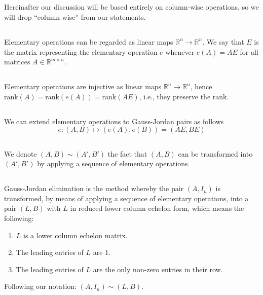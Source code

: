 \documentclass{proc-l}
\theoremstyle{definition}
\theoremstyle{remark}
\numberwithin{equation}{section}
\newcommand{\R}{\mathbb{R}}
\newcommand{\rank}[1]{\textrm{rank}({#1})}
\newcommand{\x}{\times}
\begin{document}
\subsection{}
Hereinafter our discussion will be based entirely on column-wise operations, so we will drop ``column-wise'' from our statements.

\subsection{}
Elementary operations can be regarded as linear maps $\R^n \to \R^n$. We say that $E$ is the matrix representing the elementary operation $e$ whenever $e(A) = AE$ for all matrices $A\in\R^{m\x n}$.

\subsection{}
Elementary operations are injective as linear maps $\R^n \to \R^n$, hence $\rank{A} = \rank{e(A)} = \rank{AE}$, i.e., they preserve the rank.

\subsection{}
We can extend elementary operations to Gauss-Jordan pairs as follows
\[
e: (A, B) \mapsto (e(A), e(B)) = (AE, BE)
\]

\subsection{}
We denote $(A, B) \sim (A', B')$ the fact that $(A, B)$ can be transformed into $(A', B')$ by applying a sequence of elementary operations.

\subsection{}
Gauss-Jordan elimination is the method whereby the pair $(A, I_n)$ is transformed, by means of applying a sequence of elementary operations, into a pair $(L, B)$ with $L$ in reduced lower column echelon form, which means the following:
\begin{enumerate}
\item $L$ is a lower column echelon matrix.
\item The leading entries of $L$ are $1$.
\item The leading entries of $L$ are the only non-zero entries in their row. 
\end{enumerate}
Following our notation: $(A, I_n)\sim (L, B)$. 
\end{document}
